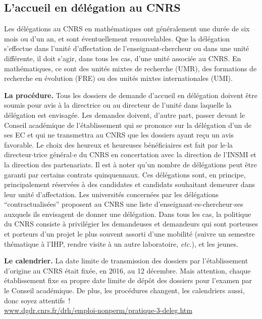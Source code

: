 \subsection*{L'accueil en d\'el\'egation au CNRS}


Les d\'el\'egations au CNRS en math\'ematiques ont g\'en\'eralement
une dur\'ee de six mois ou d'un an, et sont \'eventuellement
renouvelables. Que la d\'el\'egation s'effectue dans l'unit\'e
d'affectation de l'enseignant-chercheur ou dans une unit\'e
diff\'erente, il doit s'agir, dans tous les cas, d'une unit\'e
associ\'ee au CNRS. En math\'ematiques, ce sont des unit\'es mixtes de
recherche (UMR), des formations de recherche en \'evolution (FRE)
ou des unit\'es mixtes internationales (UMI).

\textbf{La proc\'edure.} Tous les dossiers de demande d'accueil en
d\'el\'egation doivent \^etre soumis pour avis \`a la directrice ou au directeur de
l'unit\'e dans laquelle la d\'el\'egation est envisag\'ee. Les
demandes doivent, d'autre part, passer devant le Conseil
acad\'emique de l'\'etablissement qui se prononce sur la d\'el\'egation d'un de ses EC
et qui ne transmettra au CNRS que les dossiers ayant re\c cu un
avis favorable. Le choix des heureux et heureuses b\'en\'eficiaires est fait par
le$\cdot$la directeur$\cdot$trice g\'en\'eral$\cdot$e du CNRS en concertation avec la direction
de l'INSMI et la direction des partenariats. Il est \`a noter
qu'un nombre de d\'el\'egations peut \^etre garanti par certains
contrats quinquennaux. Ces d\'el\'egations sont, en principe,
principalement r\'eserv\'ees \`a des candidates et candidats souhaitant demeurer
dans leur unit\'e d'affectation. Les universit\'es concern\'ees par
les d\'el\'egations ``contractualis\'ees'' proposent au CNRS
une liste d'enseignant$\cdot$es-chercheur$\cdot$ses auxquels ils envisagent de donner
une d\'el\'egation. Dans tous les cas, la politique du CNRS consiste
\`a privil\'egier les demandeuses et demandeurs qui sont porteuses et porteurs d'un projet le plus souvent
assorti d'une mobilit\'e (suivre un semestre th\'ematique \`a l'IHP,
rendre visite \`a un autre laboratoire, {\em etc.}), et les jeunes. 

\textbf{Le calendrier.} La date limite de transmission des dossiers
par l'\'etablissement d'origine au CNRS \'etait fix\'ee, en 2016, au
12 d\'ecembre. Mais attention, chaque \'etablissement fixe sa propre
date limite de d\'ep\^ot des dossiers pour l'examen par le Conseil
acad\'emique. De plus, les proc\'edures changent, les
calendriers aussi, donc soyez attentifs~! \\
\url{www.dgdr.cnrs.fr/drh/emploi-nonperm/pratique-3-deleg.htm}

